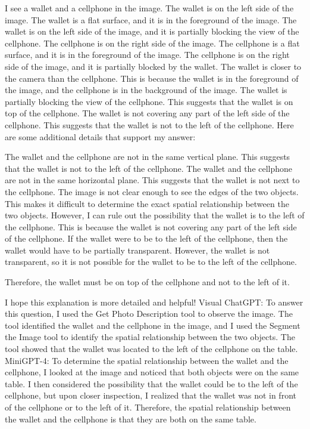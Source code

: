 \begin{enumerate}
    I see a wallet and a cellphone in the image.
    The wallet is on the left side of the image. The wallet is a flat surface, and it is in the foreground of the image. The wallet is on the left side of the image, and it is partially blocking the view of the cellphone.
    The cellphone is on the right side of the image. The cellphone is a flat surface, and it is in the foreground of the image. The cellphone is on the right side of the image, and it is partially blocked by the wallet.
    The wallet is closer to the camera than the cellphone. This is because the wallet is in the foreground of the image, and the cellphone is in the background of the image.
    The wallet is partially blocking the view of the cellphone. This suggests that the wallet is on top of the cellphone.
    The wallet is not covering any part of the left side of the cellphone. This suggests that the wallet is not to the left of the cellphone.
    Here are some additional details that support my answer:
    
    The wallet and the cellphone are not in the same vertical plane. This suggests that the wallet is not to the left of the cellphone.
    The wallet and the cellphone are not in the same horizontal plane. This suggests that the wallet is not next to the cellphone.
    The image is not clear enough to see the edges of the two objects. This makes it difficult to determine the exact spatial relationship between the two objects.
    However, I can rule out the possibility that the wallet is to the left of the cellphone. This is because the wallet is not covering any part of the left side of the cellphone. If the wallet were to be to the left of the cellphone, then the wallet would have to be partially transparent. However, the wallet is not transparent, so it is not possible for the wallet to be to the left of the cellphone.
    
    Therefore, the wallet must be on top of the cellphone and not to the left of it.
    
    I hope this explanation is more detailed and helpful!
    \subitem Visual ChatGPT: To answer this question, I used the Get Photo Description tool to observe the image. The tool identified the wallet and the cellphone in the image, and I used the Segment the Image tool to identify the spatial relationship between the two objects. The tool showed that the wallet was located to the left of the cellphone on the table.
    \subitem MiniGPT-4: To determine the spatial relationship between the wallet and the cellphone, I looked at the image and noticed that both objects were on the same table. I then considered the possibility that the wallet could be to the left of the cellphone, but upon closer inspection, I realized that the wallet was not in front of the cellphone or to the left of it. Therefore, the spatial relationship between the wallet and the cellphone is that they are both on the same table.
\end{enumerate}
